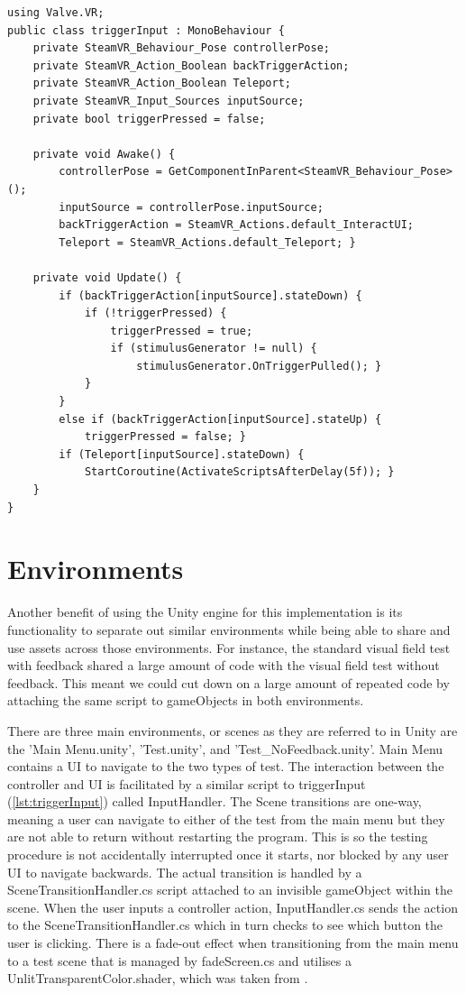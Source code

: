 \documentclass{l4proj}
\begin{document}
\begin{lstlisting}[language={[Sharp]C}, float=h!, caption={Simplified exert from triggerInput.cs to showcase how SteamVR is used for interaction.}]
using Valve.VR;
public class triggerInput : MonoBehaviour {
    private SteamVR_Behaviour_Pose controllerPose;
    private SteamVR_Action_Boolean backTriggerAction;
    private SteamVR_Action_Boolean Teleport;
    private SteamVR_Input_Sources inputSource;
    private bool triggerPressed = false;

    private void Awake() {
        controllerPose = GetComponentInParent<SteamVR_Behaviour_Pose>();
        inputSource = controllerPose.inputSource;
        backTriggerAction = SteamVR_Actions.default_InteractUI;
        Teleport = SteamVR_Actions.default_Teleport; }
    
    private void Update() {
        if (backTriggerAction[inputSource].stateDown) {
            if (!triggerPressed) {
                triggerPressed = true;
                if (stimulusGenerator != null) {
                    stimulusGenerator.OnTriggerPulled(); }
            }
        }
        else if (backTriggerAction[inputSource].stateUp) {
            triggerPressed = false; }
        if (Teleport[inputSource].stateDown) {
            StartCoroutine(ActivateScriptsAfterDelay(5f)); }
    }
}
\end{lstlisting} \label{lst:triggerInput}
\newpage
\section{Environments}
Another benefit of using the Unity engine for this implementation is its functionality to separate out similar environments while being able to share and use assets across those environments. For instance, the standard visual field test with feedback shared a large amount of code with the visual field test without feedback. This meant we could cut down on a large amount of repeated code by attaching the same script to gameObjects in both environments. 

There are three main environments, or scenes as they are referred to in Unity are the 'Main Menu.unity', 'Test.unity', and 'Test\_NoFeedback.unity'. Main Menu contains a UI to navigate to the two types of test. The interaction between the controller and UI is facilitated by a similar script to triggerInput (\ref{lst:triggerInput}) called InputHandler. The Scene transitions are one-way, meaning a user can navigate to either of the test from the main menu but they are not able to return without restarting the program. This is so the testing procedure is not accidentally interrupted once it starts, nor blocked by any user UI to navigate backwards. The actual transition is handled by a SceneTransitionHandler.cs script attached to an invisible gameObject within the scene. When the user inputs a controller action, InputHandler.cs sends the action to the SceneTransitionHandler.cs which in turn checks to see which button the user is clicking. There is a fade-out effect when transitioning from the main menu to a test scene that is managed by fadeScreen.cs and utilises a UnlitTransparentColor.shader, which was taken from \citet{valembois2021tutorial}.
\end{document}
